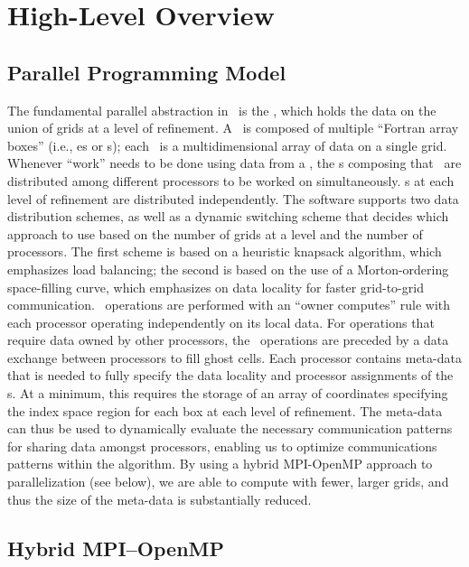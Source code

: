\section{High-Level Overview}

\subsection{Parallel Programming Model}

The fundamental parallel abstraction in \BoxLib\ is the \MultiFab, which holds the data on the 
union of grids at a level of refinement.  A \MultiFab\ is composed of multiple ``Fortran array boxes''
(i.e., \FArrayBox es or \Fab s); each \Fab\ is a multidimensional array of data on a single grid. 
Whenever ``work'' needs to be done using data from a \MultiFab, the 
\Fab s composing that \MultiFab\ are distributed among different processors 
to be worked on simultaneously.  \Fab s at each level of refinement are distributed 
independently.  The software supports two data distribution schemes, as well as a 
dynamic switching scheme that decides which approach to use based on the number of 
grids at a level and the number of processors.  The first scheme is based on a 
heuristic knapsack algorithm, which emphasizes load balancing; the second is based on 
the use of a Morton-ordering space-filling curve, which emphasizes on data locality for
faster grid-to-grid communication. 
\MultiFab\ operations are performed with an ``owner computes'' rule 
with each processor operating independently on its local data.  For operations that 
require data owned by other processors, the \MultiFab\ operations are preceded by a 
data exchange between processors to fill ghost cells.  Each processor contains 
meta-data that is needed 
to fully specify the data locality and processor assignments of the \Fab s. At a 
minimum, this requires the storage of an array of coordinates specifying the index space 
region for each box at each level of refinement.  The meta-data can thus be used to 
dynamically evaluate the necessary communication patterns for sharing data amongst 
processors, enabling us to optimize communications patterns within the algorithm.
By using a hybrid MPI-OpenMP approach to parallelization (see below), we are able to 
compute with fewer, larger grids, and thus the size of the meta-data is substantially 
reduced.

\subsection{Hybrid MPI--OpenMP}

